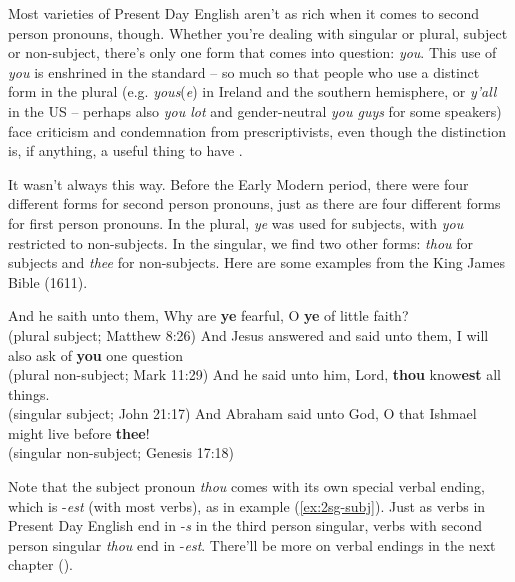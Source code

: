 Most varieties of Present Day English aren't as rich when it comes to second person pronouns, though. Whether you're dealing with singular or plural, subject or non-subject, there's only one form that comes into question: \textit{you}. This use of \textit{you} is enshrined in the standard \citep[177]{Wales1983} -- so much so that people who use a distinct form in the plural (e.g. \textit{yous}(\textit{e}) in Ireland and the southern hemisphere, or \textit{y'all} in the US -- perhaps also \textit{you lot} and gender-neutral \textit{you guys} for some speakers) face criticism and condemnation from prescriptivists, even though the distinction is, if anything, a useful thing to have \citep{Hickey2003}.

It wasn't always this way. Before the Early Modern period, there were four different forms for second person pronouns, just as there are four different forms for first person pronouns. In the plural, \textit{ye} was used for subjects, with \textit{you} restricted to non-subjects. In the singular, we find two other forms: \textit{thou} for subjects and \textit{thee} for non-subjects. Here are some examples from the King James Bible (1611).

\begin{exe}
\ex And he saith unto them, Why are \textbf{ye} fearful, O \textbf{ye} of little faith?\\ (plural subject; Matthew 8:26)
\ex And Jesus answered and said unto them, I will also ask of \textbf{you} one question\\ (plural non-subject; Mark 11:29)
\ex And he said unto him, Lord, \textbf{thou} know\textbf{est} all things.\\ (singular subject; John 21:17)\label{ex:2sg-subj}
\ex And Abraham said unto God, O that Ishmael might live before \textbf{thee}!\\ (singular non-subject; Genesis 17:18)
\end{exe}

\noindent Note that the subject pronoun \textit{thou} comes with its own special verbal ending, which is -\textit{est} (with most verbs), as in example (\ref{ex:2sg-subj}). Just as verbs in Present Day English end in -\textit{s} in the third person singular, verbs with second person singular \textit{thou} end in -\textit{est}. There'll be more on verbal endings in the next chapter ().

